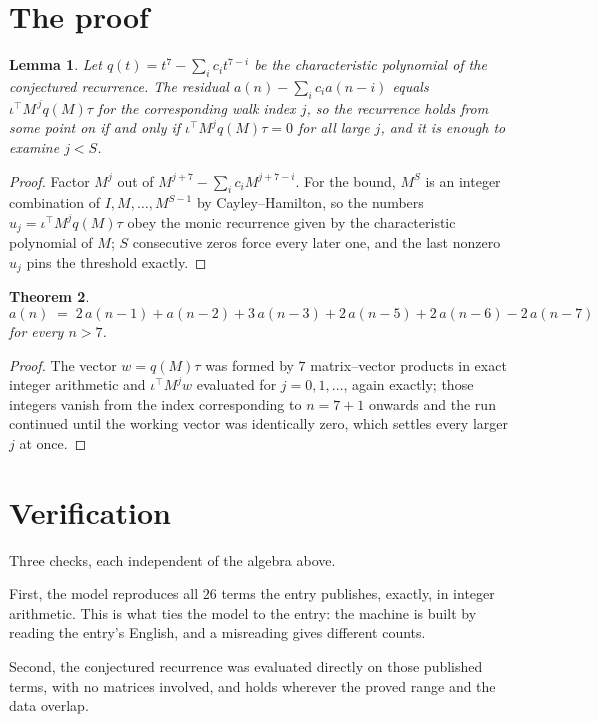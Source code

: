 \documentclass[11pt,a4paper]{article}
\theoremstyle{plain}
\newtheorem{theorem}{Theorem}
\newtheorem{lemma}[theorem]{Lemma}
\theoremstyle{definition}
\begin{document}
\section{The proof}

\begin{lemma}\label{lem:crit}
Let $q(t)=t^{7}-\sum_i c_it^{7-i}$ be the characteristic polynomial of the
conjectured recurrence. The residual $a(n)-\sum_ic_ia(n-i)$ equals
$\iota^{\!\top}M^{\,j}q(M)\tau$ for the corresponding walk index $j$, so the recurrence
holds from some point on if and only if $\iota^{\!\top}M^{j}q(M)\tau=0$ for all large $j$,
and it is enough to examine $j<S$.
\end{lemma}

\begin{proof}
Factor $M^{j}$ out of $M^{j+7}-\sum_ic_iM^{j+7-i}$. For the bound, $M^{S}$
is an integer combination of $I,M,\dots,M^{S-1}$ by Cayley--Hamilton, so the numbers
$u_j=\iota^{\!\top}M^{j}q(M)\tau$ obey the monic recurrence given by the characteristic
polynomial of $M$; $S$ consecutive zeros force every later one, and the last nonzero $u_j$
pins the threshold exactly.
\end{proof}

\begin{theorem}
\[
a(n)\;=\;2\,a(n-1) + a(n-2) + 3\,a(n-3) + 2\,a(n-5) + 2\,a(n-6) - 2\,a(n-7)
\]
for every $n>7$.
\end{theorem}

\begin{proof}
The vector $w=q(M)\tau$ was formed by $7$ matrix--vector products in exact integer
arithmetic and $\iota^{\!\top}M^{j}w$ evaluated for $j=0,1,\dots$, again exactly; those
integers vanish from the index corresponding to $n=7+1$ onwards and the run continued
until the working vector was identically zero, which settles every larger $j$ at once.
\end{proof}

\section{Verification}

Three checks, each independent of the algebra above.

First, the model reproduces all $26$ terms the entry publishes, exactly, in integer
arithmetic. This is what ties the model to the entry: the machine is built by reading the
entry's English, and a misreading gives different counts.

Second, the conjectured recurrence was evaluated directly on those published terms, with no
matrices involved, and holds wherever the proved range and the data overlap.
\end{document}
